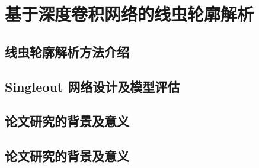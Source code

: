 \chapter{基于深度卷积网络的线虫轮廓解析}

\section{线虫轮廓解析方法介绍}

\section{Singleout 网络设计及模型评估}


\section{论文研究的背景及意义}

\section{论文研究的背景及意义}